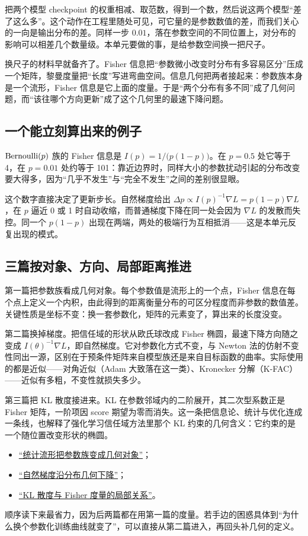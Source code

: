 把两个模型 checkpoint 的权重相减、取范数，得到一个数，然后说这两个模型``差了这么多''。这个动作在工程里随处可见，可它量的是参数数值的差，而我们关心的一向是输出分布的差。同样一步 \(0.01\)，落在参数空间的不同位置上，对分布的影响可以相差几个数量级。本单元要做的事，是给参数空间换一把尺子。

换尺子的材料早就备齐了。Fisher 信息把``参数微小改变时分布有多容易区分''压成一个矩阵，黎曼度量把``长度''写进弯曲空间。信息几何把两者接起来：参数族本身是一个流形，Fisher 信息是它上面的度量。于是``两个分布有多不同''成了几何问题，而``该往哪个方向更新''成了这个几何里的最速下降问题。

\subsection{一个能立刻算出来的例子}

\(\operatorname{Bernoulli}(p)\) 族的 Fisher 信息是 \(I(p)=1/\bigl(p(1-p)\bigr)\)。在 \(p=0.5\) 处它等于 4，在 \(p=0.01\) 处约等于 101：靠近边界时，同样大小的参数扰动引起的分布改变要大得多，因为``几乎不发生''与``完全不发生''之间的差别很显眼。

这个数字直接决定了更新步长。自然梯度给出 \(\Delta p\propto I(p)^{-1}\nabla L=p(1-p)\nabla L\)，在 \(p\) 逼近 0 或 1 时自动收缩，而普通梯度下降在同一处会因为 \(\nabla L\) 的发散而失控。同一个 \(p(1-p)\) 出现在两端，两处的极端行为互相抵消——这是本单元反复出现的模式。

\subsection{三篇按对象、方向、局部距离推进}

第一篇把参数族看成几何对象。每个参数值是流形上的一个点，Fisher 信息在每个点上定义一个内积，由此得到的距离衡量分布的可区分程度而非参数的数值差。关键性质是坐标不变：换一套参数化，矩阵的元素变了，算出来的长度没变。

第二篇换掉梯度。把信任域的形状从欧氏球改成 Fisher 椭圆，最速下降方向随之变成 \(I(\theta)^{-1}\nabla L\)，即自然梯度。它对参数化方式不变，与 Newton 法的仿射不变性同出一源，区别在于预条件矩阵来自模型族还是来自目标函数的曲率。实际使用的都是近似——对角近似（Adam 大致落在这一类）、Kronecker 分解（K-FAC）——近似有多粗，不变性就损失多少。

第三篇把 KL 散度接进来。KL 在参数邻域内的二阶展开，其二次型系数正是 Fisher 矩阵，一阶项因 score 期望为零而消失。这一条把信息论、统计与优化连成一条线，也解释了强化学习信任域方法里那个 KL 约束的几何含义：它约束的是一个随位置改变形状的椭圆。

\begin{itemize}
\tightlist
\item \hyperref[sec:12-Real-Analysis-Support/09-Information-Geometry/01]{``统计流形把参数族变成几何对象''}；
\item \hyperref[sec:12-Real-Analysis-Support/09-Information-Geometry/02]{``自然梯度沿分布几何下降''}；
\item \hyperref[sec:12-Real-Analysis-Support/09-Information-Geometry/03]{``KL 散度与 Fisher 度量的局部关系''}。
\end{itemize}

顺序读下来最省力，因为后两篇都在用第一篇的度量。若手边的困惑具体到``为什么换个参数化训练曲线就变了''，可以直接从第二篇进入，再回头补几何的定义。
